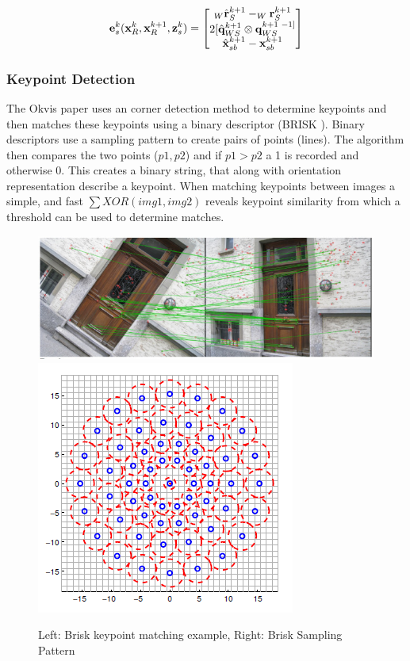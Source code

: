 \documentclass[a4paper,11pt,notitlepage]{article}
\begin{document}
\begin{equation}
\mathbf{e}^{k}_{s}(\mathbf{x}^{k}_{R},\mathbf{x}^{k+1}_{R},\mathbf{z}_{s}^{k}) = 
\begin{bmatrix}
       _{W} \hat{\mathbf{r}}_{S}^{k+1} - _{W}\mathbf{r}_{S}^{k+1} \\
       
       2[\hat{\mathbf{q}}_{WS}^{k+1} \otimes \mathbf{q}_{WS}^{k+1 \textnormal{ } -1]} \\
       
       \hat{\mathbf{x}}^{k+1}_{sb} - \mathbf{x}_{sb}^{k+1}
\end{bmatrix}
\label{imu_error_}
\end{equation}



\subsubsection{Keypoint Detection}\label{BRISK_section}

The Okvis \cite{Okvis_1} paper uses an corner detection method to determine keypoints and then matches these keypoints using a binary descriptor (BRISK \cite{BRISK}). Binary descriptors use a sampling pattern to create pairs of points (lines). The algorithm then compares the two points ($p1,p2$) and if $p1 > p2$ a 1 is recorded and otherwise 0. This creates a binary string, that along with orientation representation describe a keypoint. When matching keypoints between images a simple, and fast $\sum XOR(img1,img2)$ reveals keypoint similarity from which a threshold can be used to determine matches.

\noindent \begin{figure}[h!] 
\includegraphics[width = 0.7\hsize]{figures/brisk.jpg}
\includegraphics[width = 0.26\hsize]{figures/brisk.png}
\caption{Left: Brisk keypoint matching example, Right: Brisk Sampling Pattern \cite{BRISK} }
\label{Brisk}
\end{figure}
\end{document}
